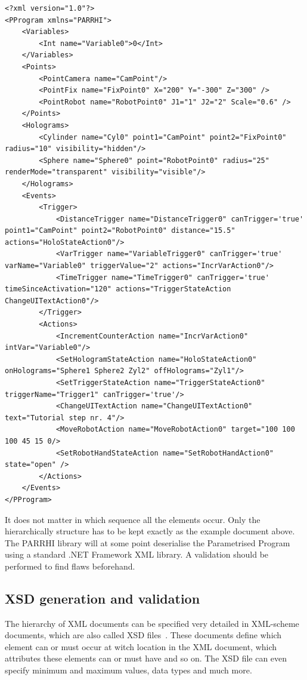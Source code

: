\begin{lstlisting}
<?xml version="1.0"?>
<PProgram xmlns="PARRHI">
	<Variables>
		<Int name="Variable0">0</Int>
	</Variables>
	<Points>
		<PointCamera name="CamPoint"/>
		<PointFix name="FixPoint0" X="200" Y="-300" Z="300" />
		<PointRobot name="RobotPoint0" J1="1" J2="2" Scale="0.6" />
	</Points>
	<Holograms>
		<Cylinder name="Cyl0" point1="CamPoint" point2="FixPoint0" radius="10" visibility="hidden"/>
		<Sphere name="Sphere0" point="RobotPoint0" radius="25" renderMode="transparent" visibility="visible"/>
	</Holograms>
	<Events>
		<Trigger>
			<DistanceTrigger name="DistanceTrigger0" canTrigger='true' point1="CamPoint" point2="RobotPoint0" distance="15.5" actions="HoloStateAction0"/>
			<VarTrigger name="VariableTrigger0" canTrigger='true' varName="Variable0" triggerValue="2" actions="IncrVarAction0"/>
			<TimeTrigger name="TimeTrigger0" canTrigger='true' timeSinceActivation="120" actions="TriggerStateAction ChangeUITextAction0"/>
		</Trigger>
		<Actions>
			<IncrementCounterAction name="IncrVarAction0" intVar="Variable0"/>
			<SetHologramStateAction name="HoloStateAction0" onHolograms="Sphere1 Sphere2 Zyl2" offHolograms="Zyl1"/>
			<SetTriggerStateAction name="TriggerStateAction0" triggerName="Trigger1" canTrigger='true'/>
			<ChangeUITextAction name="ChangeUITextAction0" text="Tutorial step nr. 4"/>
			<MoveRobotAction name="MoveRobotAction0" target="100 100 100 45 15 0/>
			<SetRobotHandStateAction name="SetRobotHandAction0" state="open" />
		</Actions>
	</Events>
</PProgram>
\end{lstlisting}

It does not matter in which sequence all the elements occur. Only the hierarchically structure has to be kept exactly as the example document above. The PARRHI library will at some point deserialise the Parametrised Program using a standard .NET Framework XML library. A validation should be performed to find flaws beforehand.

\subsection{XSD generation and validation}
The hierarchy of XML documents can be specified very detailed in XML-scheme documents, which are also called XSD files~\cite{xsdW3C}. These documents define which element can or must occur at witch location in the XML document, which attributes these elements can or must have and so on. The XSD file can even specify minimum and maximum values, data types and much more.

